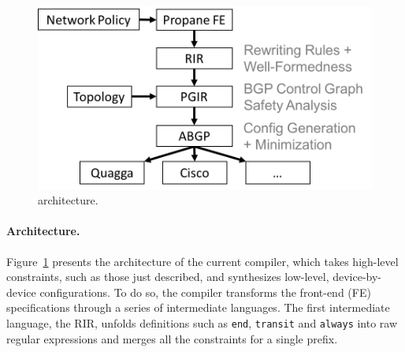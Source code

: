 %
\begin{figure}
  \centering
  \includegraphics[width=.45\textwidth]{figures/pipeline}
%
\caption{\Propane architecture.
}
  \label{fig:pipeline}
  \vspace{-1em}
\end{figure}
%
\paragraph*{Architecture.}
Figure~\ref{fig:pipeline} presents the architecture of the
current \Propane compiler, which takes high-level constraints, such as those
just described, and synthesizes low-level, device-by-device configurations.  
To do so, the compiler transforms the front-end (FE) specifications through
a series of intermediate languages.  The first intermediate language, the
RIR, unfolds definitions such as \texttt{end}, \texttt{transit} and \texttt{always} into raw regular expressions and merges all the constraints for a single
prefix.  

